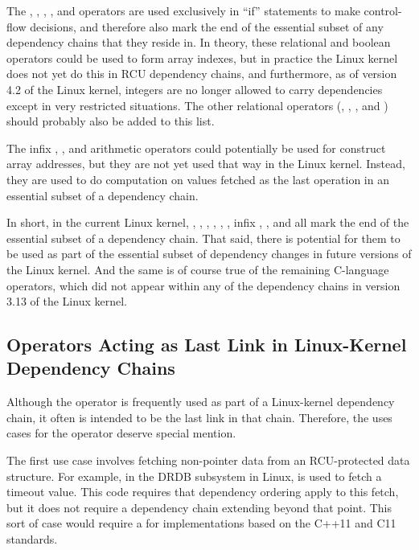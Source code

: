 \documentclass[letterpaper,twocolumn,10pt]{article}
\begin{document}
The \co{!}, \co{==}, \co{!=}, \co{&&}, and \co{||} operators are
used exclusively in ``if'' statements to make control-flow decisions,
and therefore also mark the end of the essential subset of any
dependency chains that they reside in.
In theory, these relational and boolean operators could be used to
form array indexes, but in practice the Linux kernel does not yet
do this in RCU dependency chains, and furthermore, as of version 4.2
of the Linux kernel, integers are no longer allowed to carry dependencies
except in very restricted situations.
The other relational operators (\co{>}, \co{<}, \co{>=}, and \co{<=})
should probably also be added to this list.

The infix \co{*}, \co{/}, and \co{\%} arithmetic operators could potentially
be used for construct array addresses, but they are not yet used that
way in the Linux kernel.
Instead, they are used to do computation on values fetched as the
last operation in an essential subset of a dependency chain.

In short, in the current Linux kernel,
\co{()}, \co{!}, \co{==}, \co{!=}, \co{&&}, \co{||}, infix \co{*}, \co{/},
and \co{\%} all mark the end of the essential subset of a dependency
chain.
That said, there is potential for them to be used as part of the
essential subset of dependency changes in future versions of the
Linux kernel.
And the same is of course true of the remaining C-language operators,
which did not appear within any of the dependency chains in version 3.13
of the Linux kernel.

\subsection{Operators Acting as Last Link in Linux-Kernel Dependency Chains}
\label{sec:Operators Acting as Last Link in Linux-Kernel Dependency Chains}

Although the \co{->} operator is frequently used as part of a
Linux-kernel dependency chain, it often is intended to be the last link
in that chain.
Therefore, the uses cases for the \co{->} operator deserve special mention.

The first use case involves fetching non-pointer data from an RCU-protected
data structure.
For example, in the DRDB subsystem in Linux, \co{->} is used to fetch
a timeout value.
This code requires that dependency ordering apply to this fetch, but
it does not require a dependency chain extending beyond that point.
This sort of case would require a 
for implementations based on the C++11 and C11 standards.
\end{document}
